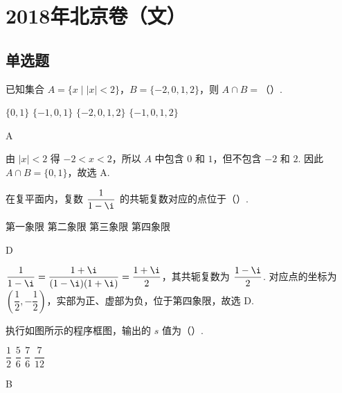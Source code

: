 \chapter{2018年北京卷（文）}

\section{单选题}

\begin{problem}
已知集合 \(A=\{x\mid \lvert x\rvert<2\}\)，\(B=\{-2,0,1,2\}\)，则 \(A\cap B=\)（\quad）.

\choices
    {\(\{0,1\}\)}
    {\(\{-1,0,1\}\)}
    {\(\{-2,0,1,2\}\)}
    {\(\{-1,0,1,2\}\)}
\end{problem}

\begin{answer}
A
\end{answer}

\begin{solution}
由 \(\lvert x\rvert<2\) 得 \(-2<x<2\)，所以 \(A\) 中包含 \(0\) 和 \(1\)，但不包含 \(-2\) 和 \(2\). 因此 \(A\cap B=\{0,1\}\)，故选 A.
\end{solution}

\begin{problem}
在复平面内，复数 \(\dfrac1{1-\i}\) 的共轭复数对应的点位于（\quad）.

\choices
    {第一象限}
    {第二象限}
    {第三象限}
    {第四象限}
\end{problem}

\begin{answer}
D
\end{answer}

\begin{solution}
\(\displaystyle \frac{1}{1-\i}=\frac{1+\i}{(1-\i)(1+\i)}=\frac{1+\i}{2}\)，其共轭复数为 \(\displaystyle \frac{1-\i}{2}\). 对应点的坐标为 \(\left(\dfrac12,-\dfrac12\right)\)，实部为正、虚部为负，位于第四象限，故选 D.
\end{solution}


\begin{problem}
执行如图所示的程序框图，输出的 \(s\) 值为（\quad）.

\begingroup
{}
\endgroup

\choices
    {\(\dfrac12\)}
    {\(\dfrac56\)}
    {\(\dfrac76\)}
    {\(\dfrac7{12}\)}
\end{problem}

\begin{answer}
B
\end{answer}

